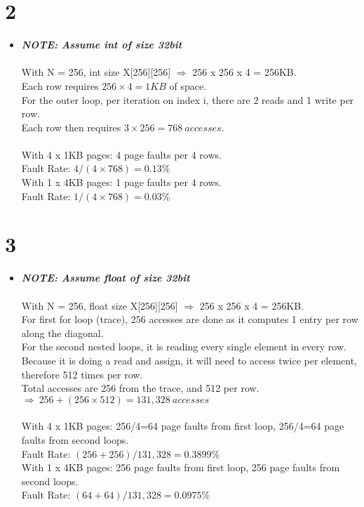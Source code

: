 \documentclass[10pt]{article}
\begin{document}
	\section*{2}
	\begin{itemize}
		\item []
		\textbf{\textit{NOTE: Assume int of size 32bit}}\\\\
		With N = 256, int size X[256][256] \(\Rightarrow\) 256 x 256 x 4 = 256KB.\\
		Each row requires \(256\times4=1KB\) of space.\\
		For the outer loop, per iteration on index i, there are 2 reads and 1 write per row.\\
		Each row then requires \(3\times256=768\ accesses \).\\\\
		With 4 x 1KB pages: 4 page faults per 4 rows.\\
		Fault Rate: \(4/(4\times768)=0.13\%\)\\
		With 1 x 4KB pages: 1 page faults per 4 rows.\\
		Fault Rate: \(1/(4\times768)=0.03\%\)\\
	\end{itemize}
	\pagebreak
	\section*{3}
	\begin{itemize}
		\item[]
		\textbf{\textit{NOTE: Assume float of size 32bit}}\\\\
		With N = 256, float size X[256][256] \(\Rightarrow\) 256 x 256 x 4 = 256KB.\\
		For first for loop (trace), 256 accesses are done as it computes 1 entry per row along the diagonal.\\
		For the second nested loops, it is reading every single element in every row.  Because it is doing a read and assign, it will need to access twice per element, therefore 512 times per row.\\
		Total accesses are 256 from the trace, and 512 per row. \(\Rightarrow\ 256+(256\times512)=131,328\ accesses\)\\\\
		With 4 x 1KB pages: 256/4=64 page faults from first loop, 256/4=64 page faults from second loops.\\
		Fault Rate: \((256+256)/131,328=0.3899\%\)\\
		With 1 x 4KB pages: 256 page faults from first loop, 256 page faults from second loops.\\
		Fault Rate: \((64+64)/131,328=0.0975\%\)
	\end{itemize}
\end{document}
